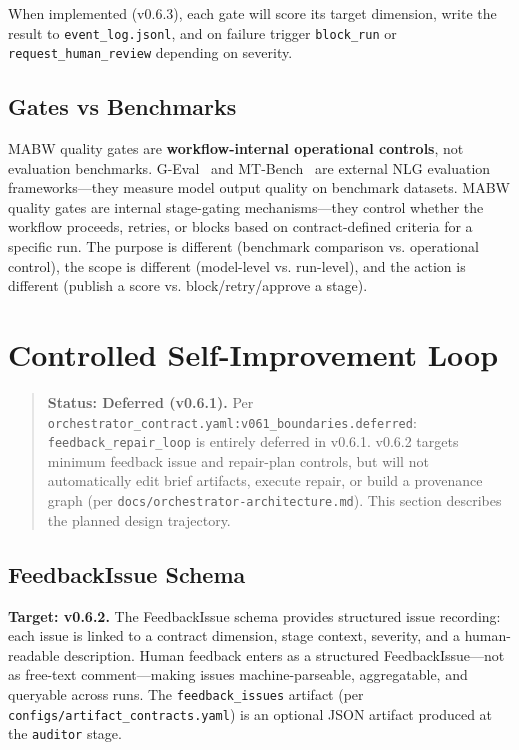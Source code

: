\documentclass[11pt,a4paper]{article}
\begin{document}
When implemented (v0.6.3), each gate will score its target dimension, write the result to \texttt{event\_log.jsonl}, and on failure trigger \texttt{block\_run} or \texttt{request\_human\_review} depending on severity.

\subsection{Gates vs Benchmarks}

MABW quality gates are \textbf{workflow-internal operational controls}, not evaluation benchmarks. G-Eval~\cite{liu2023geval} and MT-Bench~\cite{zheng2023judging} are external NLG evaluation frameworks---they measure model output quality on benchmark datasets. MABW quality gates are internal stage-gating mechanisms---they control whether the workflow proceeds, retries, or blocks based on contract-defined criteria for a specific run. The purpose is different (benchmark comparison vs. operational control), the scope is different (model-level vs. run-level), and the action is different (publish a score vs. block/retry/approve a stage).

\section{Controlled Self-Improvement Loop}
\label{sec:self-improve}

\begin{quote}
\textbf{Status: Deferred (v0.6.1).} Per \texttt{orchestrator\_contract.yaml:v061\_boundaries.deferred}: \texttt{feedback\_repair\_loop} is entirely deferred in v0.6.1. v0.6.2 targets minimum feedback issue and repair-plan controls, but will not automatically edit brief artifacts, execute repair, or build a provenance graph (per \texttt{docs/orchestrator-architecture.md}). This section describes the planned design trajectory.
\end{quote}

\subsection{FeedbackIssue Schema}

\textbf{Target: v0.6.2.} The FeedbackIssue schema provides structured issue recording: each issue is linked to a contract dimension, stage context, severity, and a human-readable description. Human feedback enters as a structured FeedbackIssue---not as free-text comment---making issues machine-parseable, aggregatable, and queryable across runs. The \texttt{feedback\_issues} artifact (per \texttt{configs/artifact\_contracts.yaml}) is an optional JSON artifact produced at the \texttt{auditor} stage.
\end{document}
